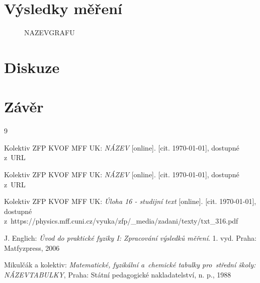 \documentclass{../concepts/titul_protokol_p/prepareprotokol} %
\begin{document}
\section{Výsledky měření}


\begin{figure}
    \centering
    \caption{NAZEVGRAFU}
    \label{fig:graf}
\end{figure}


\section{Diskuze}


\section{Závěr}


\begin{thebibliography}{9}

 Kolektiv ZFP KVOF MFF UK: \textit{NÁZEV} [online]. 
[cit. \today], dostupné z~URL

 Kolektiv ZFP KVOF MFF UK: \textit{NÁZEV} [online]. [cit. \today], dostupné
z~URL

 Kolektiv ZFP KVOF MFF UK: \textit{Úloha 16 - studijní text} 
[online]. [cit. \today], dostupné
z~https://physics.mff.cuni.cz/vyuka/zfp/\_media/zadani/texty/txt\_316.pdf

 J. Englich: \textit{Úvod do praktické fyziky I: Zpracování výsledků měření}. 
1. vyd. Praha: Matfyzpress, 2006

 Mikulčák a kolektiv: \textit{Matematické, fyzikální a~chemické tabulky pro~střední 
školy: NÁZEVTABULKY}, Praha: Státní pedagogické nakladatelství, n. p., 1988

\end{thebibliography}
\end{document}
